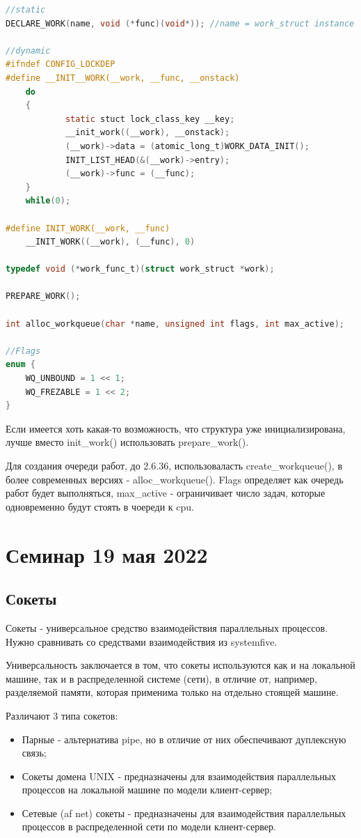 \documentclass[12pt,a4paper]{scrreprt}
\begin{document}
\begin{lstlisting}[language=C]
//static
DECLARE_WORK(name, void (*func)(void*)); //name = work_struct instance

//dynamic
#ifndef CONFIG_LOCKDEP
#define __INIT__WORK(__work, __func, __onstack)
	do 
	{
			static stuct lock_class_key __key;
			__init_work((__work), __onstack);
			(__work)->data = (atomic_long_t)WORK_DATA_INIT();
			INIT_LIST_HEAD(&(__work)->entry);
			(__work)->func = (__func);
	}
	while(0);

#define INIT_WORK(__work, __func)
	__INIT_WORK((__work), (__func), 0)
	
typedef void (*work_func_t)(struct work_struct *work);

PREPARE_WORK();

int alloc_workqueue(char *name, unsigned int flags, int max_active);

//Flags
enum {
	WQ_UNBOUND = 1 << 1;
	WQ_FREZABLE = 1 << 2;
}
\end{lstlisting}

Если имеется хоть какая-то возможность, что структура уже инициализирована, лучше вместо init\_work() использовать prepare\_work().

Для создания очереди работ, до 2.6.36, использоваласть create\_workqueue(), в более современных версиях - alloc\_workqueue(). Flags определяет как очередь работ будет выполняться, max\_active - ограничивает число задач, которые одновременно будут стоять в чоереди к cpu.

\chapter{\textbf{Семинар 19 мая 2022}}

\section{Сокеты}

Сокеты - универсальное средство взаимодействия параллельных процессов. Нужно сравнивать со средствами взаимодействия из systemfive. 

Универсальность заключается в том, что сокеты используются как и на локальной машине, так и в распределенной системе (сети), в отличие от, например, разделяемой памяти, которая применима только на отдельно стоящей машине.

Различают 3 типа сокетов:

\begin{itemize}
	\item Парные - альтернатива pipe, но в отличие от них обеспечивают дуплексную связь;
	\item Сокеты домена UNIX - предназначены для взаимодействия параллельных процессов на локальной машине по модели клиент-сервер;
	\item Сетевые (af net) сокеты - предназначены для взаимодействия параллельных процессов в распределенной сети по модели клиент-сервер.
\end{itemize}
\end{document}
